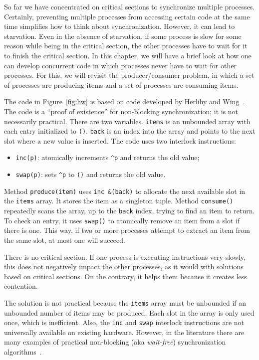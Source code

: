 \documentclass{report}
\begin{document}
So far we have concentrated on critical sections to synchronize multiple
processes.  Certainly, preventing multiple processes from accessing
certain code at the same time simplifies how to think about synchronization.
However, it can lead to starvation.  Even in the absence of starvation,
if some process is slow for some reason while being in the critical section,
the other processes have to wait for it to finish the critical section.
In this chapter, we will have a brief look at how one can develop concurrent
code in which processes never have to wait for other processes.
For this, we will revisit the producer/consumer problem, in which a
set of processes are producing items and a set of processes are
consuming items.

The code in Figure~\ref{fig:hw} is based on code developed by Herlihy and
Wing~\cite{HW87}.
The code is a ``proof of existence'' for non-blocking synchronization; it
is not necessarily practical.
There are two variables.  \texttt{items} is an unbounded array with each
entry initialized to \texttt{()}.  \texttt{back} is an index into the
array and points to the next slot where a new value is inserted.
The code uses two interlock instructions:
\begin{itemize}
\item \texttt{inc(p)}: atomically increments \texttt{\^{}p} and returns
the old value;
\item \texttt{swap(p)}: sets \texttt{\^{}p} to \texttt{()} and returns
the old value.
\end{itemize}

Method \texttt{produce(item)} uses \texttt{inc \&(back)} to allocate
the next available slot in the \texttt{items} array.
It stores the item as a singleton tuple.
Method \texttt{consume()} repeatedly scans the array, up to the
\texttt{back} index, trying to find an item to return.
To check an entry, it uses \texttt{swap()}
to atomically remove an item from a slot if there is one.
This way, if two or more processes attempt to extract an item from
the same slot, at most one will succeed.

There is no critical section.  If one process is executing instructions
very slowly, this does not negatively impact the other processes, as it
would with solutions based on critical sections.
On the contrary, it helps them because it creates less contention.

The solution is not practical because the \texttt{items} array must be
unbounded if an unbounded number of items may be produced.  Each slot
in the array is only used once, which is inefficient.  Also, the \texttt{inc}
and \texttt{swap} interlock instructions are not universally available
on existing hardware.
However, in the literature there are many examples of practical
non-blocking (aka \emph{wait-free})
synchronization algorithms~\cite{}.
\end{document}

